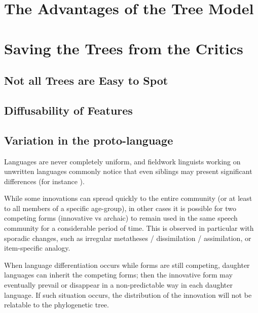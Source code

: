 \documentclass[oneside,a4paper,11pt]{article}
\begin{document}
 
\section{The Advantages of the Tree Model}
\section{Saving the Trees from the Critics}
\subsection{Not all Trees are Easy to Spot}
\subsection{Diffusability of Features}
%


%

\subsection{Variation in the proto-language}
Languages are never completely uniform, and fieldwork linguists working on unwritten languages commonly notice that even siblings may present significant differences (for instance \citealt[29-30]{genetti07grammar}). 

While some innovations can spread quickly to the entire community (or at least to all members of a specific age-group), in other cases it is possible for two competing forms (innovative vs archaic) to remain used in the same  speech community for a considerable period of time. This is observed in particular with sporadic changes, such as irregular metatheses / dissimilation / assimilation, or item-specific analogy.

When language differentiation occurs while forms are still competing, daughter languages can inherit the competing forms; then the innovative form may eventually prevail or disappear in a non-predictable way in each daughter language. If such situation occurs, the distribution of the innovation will not be relatable to the phylogenetic tree.
\end{document}
